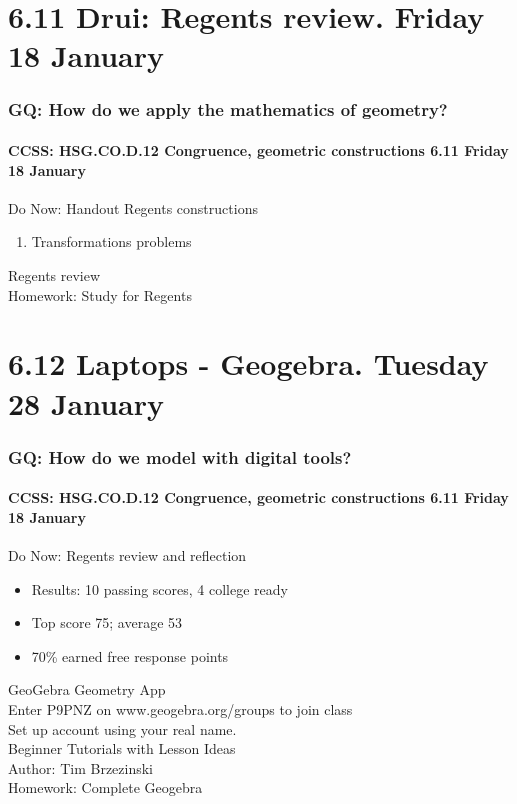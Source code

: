 \documentclass{beamer}
\begin{document}
\section{6.11 Drui: Regents review. Friday 18 January}
  \frame
  {
    \frametitle{GQ: How do we apply the mathematics of geometry?}
    \framesubtitle{CCSS: HSG.CO.D.12 Congruence, geometric constructions  \alert{6.11 Friday 18 January}}

    \begin{block}{Do Now: Handout Regents constructions}
      \begin{enumerate}
        \item Transformations problems
      \end{enumerate}
    \end{block}
    Regents review\\[0.5cm]
    Homework: Study for Regents
  }


  \section{6.12 Laptops - Geogebra. Tuesday 28 January}
    \frame
    {
      \frametitle{GQ: How do we model with digital tools?}
      \framesubtitle{CCSS: HSG.CO.D.12 Congruence, geometric constructions  \alert{6.11 Friday 18 January}}

      \begin{block}{Do Now: Regents review and reflection}
        \begin{itemize}
          \item Results: 10 passing scores, 4 college ready
          \item Top score 75; average 53
          \item 70\% earned free response points
        \end{itemize}
      \end{block}
      GeoGebra Geometry App\\
      Enter \alert{P9PNZ} on www.geogebra.org/groups to join class\\
      Set up account using your real name.\\
      Beginner Tutorials with Lesson Ideas\\
      Author: Tim Brzezinski\\[0.5cm]
      Homework: Complete Geogebra
    }
\end{document}

